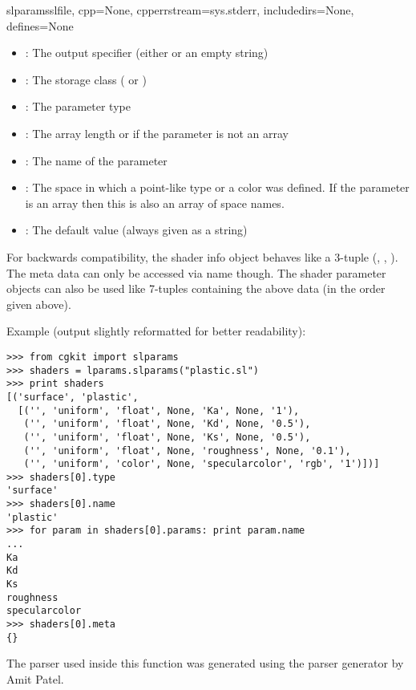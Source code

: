\begin{funcdesc}{slparams}{slfile, cpp=None, cpperrstream=sys.stderr, includedirs=None, defines=None}
\begin{itemize}
\item {}: The output specifier (either  or an empty
string)
\item {}: The storage class ( or ) 
\item {}: The parameter type 
\item {}: The array length or  if the parameter is not
an array
\item {}: The name of the parameter 
\item {}: The space in which a point-like type or a color was
defined. If the parameter is an array then this is also an array of space names.
\item {}: The default value (always given as a string)
\end{itemize}

For backwards compatibility, the shader info object behaves like a
3-tuple (, , ). The meta data can only be
accessed via name though. The shader parameter objects can also be used
like 7-tuples containing the above data (in the order given above).

Example (output slightly reformatted for better readability):
 
\begin{verbatim}
>>> from cgkit import slparams
>>> shaders = lparams.slparams("plastic.sl")
>>> print shaders
[('surface', 'plastic', 
  [('', 'uniform', 'float', None, 'Ka', None, '1'),
   ('', 'uniform', 'float', None, 'Kd', None, '0.5'),
   ('', 'uniform', 'float', None, 'Ks', None, '0.5'),
   ('', 'uniform', 'float', None, 'roughness', None, '0.1'),
   ('', 'uniform', 'color', None, 'specularcolor', 'rgb', '1')])]
>>> shaders[0].type
'surface'
>>> shaders[0].name
'plastic'
>>> for param in shaders[0].params: print param.name
... 
Ka
Kd
Ks
roughness
specularcolor
>>> shaders[0].meta
{}
\end{verbatim}

The parser used inside this function was generated using the parser
generator  
by Amit Patel.
\end{funcdesc}

